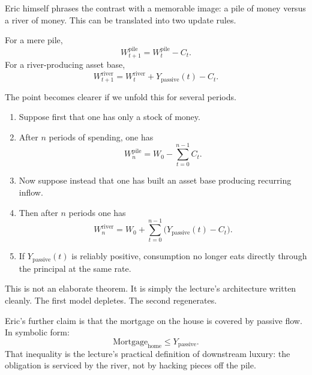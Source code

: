 Eric himself phrases the contrast with a memorable image: a pile of money versus a river of money. This can be translated into two update rules.

For a mere pile,
\begin{equation}
W_{t+1}^{\mathrm{pile}} = W_t^{\mathrm{pile}} - C_t.
\end{equation}
For a river-producing asset base,
\begin{equation}
W_{t+1}^{\mathrm{river}} = W_t^{\mathrm{river}} + Y_{\mathrm{passive}}(t) - C_t.
\end{equation}

The point becomes clearer if we unfold this for several periods.

\begin{enumerate}
\item Suppose first that one has only a stock of money.
\item After \(n\) periods of spending, one has
\begin{equation}
W_n^{\mathrm{pile}} = W_0 - \sum_{t=0}^{n-1} C_t.
\end{equation}
\item Now suppose instead that one has built an asset base producing recurring inflow.
\item Then after \(n\) periods one has
\begin{equation}
W_n^{\mathrm{river}} = W_0 + \sum_{t=0}^{n-1}\bigl(Y_{\mathrm{passive}}(t)-C_t\bigr).
\end{equation}
\item If \(Y_{\mathrm{passive}}(t)\) is reliably positive, consumption no longer eats directly through the principal at the same rate.
\end{enumerate}

This is not an elaborate theorem. It is simply the lecture's architecture written cleanly. The first model depletes. The second regenerates.

Eric's further claim is that the mortgage on the house is covered by passive flow. In symbolic form:
\begin{equation}
\text{Mortgage}_{\text{home}} \le Y_{\mathrm{passive}}.
\end{equation}
That inequality is the lecture's practical definition of downstream luxury: the obligation is serviced by the river, not by hacking pieces off the pile.

